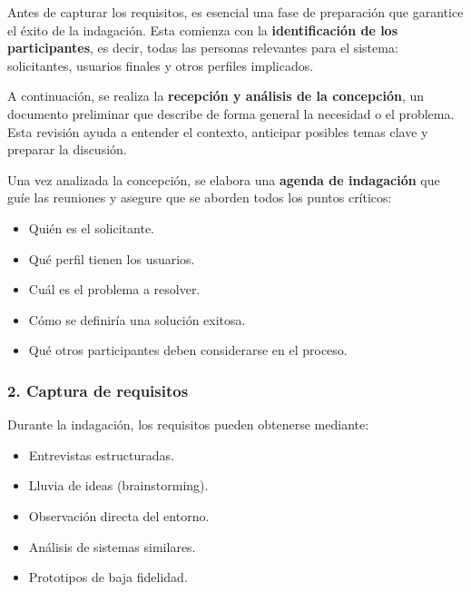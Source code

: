     Antes de capturar los requisitos, es esencial una fase de preparación que garantice el éxito de la indagación.
    Esta comienza con la \textbf{identificación de los participantes}, es decir, todas las personas relevantes para el sistema: solicitantes, usuarios finales y otros perfiles implicados.


    A continuación, se realiza la \textbf{recepción y análisis de la concepción}, un documento preliminar que describe de forma general la necesidad o el problema.
    Esta revisión ayuda a entender el contexto, anticipar posibles temas clave y preparar la discusión.


    Una vez analizada la concepción, se elabora una \textbf{agenda de indagación} que guíe las reuniones y asegure que se aborden todos los puntos críticos:

    \begin{itemize}

        \item Quién es el solicitante.

        \item Qué perfil tienen los usuarios.

        \item Cuál es el problema a resolver.

        \item Cómo se definiría una solución exitosa.

        \item Qué otros participantes deben considerarse en el proceso.

    \end{itemize}

    \subsubsection*{2. Captura de requisitos}


    Durante la indagación, los requisitos pueden obtenerse mediante:

    \begin{itemize}

        \item Entrevistas estructuradas.

        \item Lluvia de ideas (brainstorming).

        \item Observación directa del entorno.

        \item Análisis de sistemas similares.

        \item Prototipos de baja fidelidad.

    \end{itemize}

